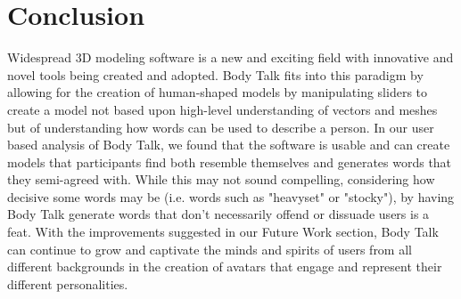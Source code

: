 \documentclass[journal]{vgtc}                %
\begin{document}
\section{Conclusion}
Widespread 3D modeling software is a new and exciting field with innovative and novel tools being created and adopted. Body Talk
fits into this paradigm by allowing for the creation of human-shaped models by manipulating sliders to create a model not
based upon high-level understanding of vectors and meshes but of understanding how words can be used to describe a person.
In our user based analysis of Body Talk, we found that the software is usable and can create models that participants find both
resemble themselves and generates words that they semi-agreed with. While this may not sound compelling, considering how
decisive some words may be (i.e. words such as "heavyset" or "stocky"), by having Body Talk generate words that don't necessarily
offend or dissuade users is a feat. With the improvements suggested in our Future Work section, Body Talk can continue to grow and 
captivate the minds and spirits of users from all different backgrounds in the creation of avatars that engage and represent their
different personalities.


%

%
%
%


\end{document}
